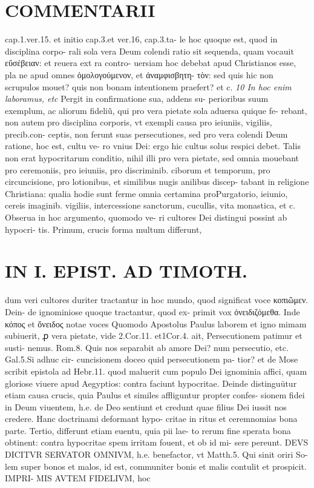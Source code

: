 \documentclass{article}
\begin{document}
\begin{pages}
\section*{COMMENTARII }
\marginpar{[ p.102 ]}\pstart cap.1.ver.15. et initio cap.3.et ver.16, cap.3.ta- le hoc quoque est, quod in disciplina corpo- rali sola vera Deum colendi ratio sit sequenda, quam vocauit εὔσέβειαν: et reuera ext ra contro- uersiam hoc debebat apud Christianos esse, pla ne apud omnes ὁμολογούμενον, et ἀναμφισβητη- τὸν: sed quis hic non scrupulos mouet? quis non bonam intentionem praefert? et c.  \pend
\textit{10 In hoc enim laboramus, etc }\pstart Pergit in confirmatione sua, addens su- perioribus suum exemplum, ac aliorum fideliũ, qui pro vera pietate sola aduersa quique fe- rebant, non autem pro disciplina corporis, vt exempli causa pro ieiuniis, vigiliis, precib.con- ceptis, non ferunt suas persecutiones, sed pro vera colendi Deum ratione, hoc est, cultu ve- ro vnius Dei: ergo hic cultus solus respici debet. Talis non erat hypocritarum conditio, nihil illi pro vera pietate, sed omnia mouebant pro ceremoniis, pro ieiuniis, pro discriminib. ciborum et temporum, pro circuncisione, pro lotionibus, et similibus nugis anilibus discep- tabant in religione Christiana: qualia hodie sunt ferme omnia certamina proPurgatorio, ieiunio, cereis imaginib. vigiliis, intercessione sanctorum, cucullis, vita monastica, et c. Obserua in hoc argumento, quomodo ve- ri cultores Dei distingui possint ab hypocri- tis. Primum, crucis forma multum differunt,  \pend
\section*{IN I. EPIST. AD TIMOTH. }
\marginpar{[ p.103 ]}\pstart dum veri cultores duriter tractantur in hoc mundo, quod significat voce κοπιῶμεν. Dein- de ignominiose quoque tractantur, quod ex- primit vox ὀνειδιζόμεθα. Inde κόπος et ὄνειδος notae voces  \pend\pstart Quomodo Apostolus Paulus laborem et igno mimam subiuerit, ꝓ vera pietate, vide 2.Cor.11. et1Cor.4. ait, Persecutionem patimur et susti- nemus. Rom.8. Quis nos separabit ab amore Dei? num persecutio, etc. Gal.5.Si adhuc cir- cuncisionem doceo quid persecutionem pa- tior? et de Mose scribit epistola ad Hebr.11. quod maluerit cum populo Dei ignominia affici, quam gloriose viuere apud Aegyptios: contra faciunt hypocritae.  \pend\pstart Deinde distinguütur etiam causa crucis, quia Paulus et similes affliguntur propter confes- sionem fidei in Deum viuentem, h.e. de Deo sentiunt et credunt quae filius Dei iussit nos credere. Hanc doctrinami deformant hypo- critae in ritus et ceremnomias bona parte.  \pend\pstart Tertio, differunt etiam euentu, quia pii lae- to rerum fine sperata bona obtinent: contra hypocritae spem irritam fouent, et ob id mi- sere pereunt.  \pend\pstart DEVS DICITVR SERVATOR OMNIVM, h.e. benefactor, vt Matth.5. Qui sinit oriri So- lem super bonos et malos, id est, communiter bonis et malis contulit et prospicit. IMPRI- MIS AVTEM FIDELIVM, hoc  \pend

\end{pages}
\end{document}
